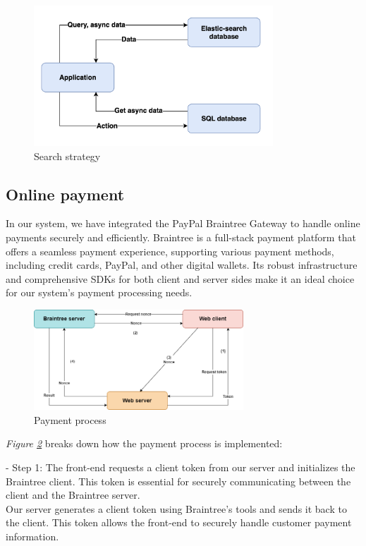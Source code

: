 \begin{figure}[H]
    \centering
    \includegraphics[width=0.8\textwidth]{Figures/search_strat.png}
    \caption{Search strategy}
    \label{fig:search-strategy}
\end{figure}

\subsection{Online payment}

In our system, we have integrated the PayPal Braintree Gateway to handle online payments securely and efficiently. Braintree is a full-stack payment platform that offers a seamless payment experience, supporting various payment methods, including credit cards, PayPal, and other digital wallets. Its robust infrastructure and comprehensive SDKs for both client and server sides make it an ideal choice for our system's payment processing needs.

\begin{figure}[H]
    \centering
    \includegraphics[width=0.7\textwidth]{Figures/payment-strat.png}
    \caption{Payment process}
    \label{fig:payment-flow}
\end{figure}

\emph{Figure \ref{fig:payment-flow}} breaks down how the payment process is implemented:

- Step 1:
The front-end requests a client token from our server and initializes the Braintree client. This token is essential for securely communicating between the client and the Braintree server.\\
Our server generates a client token using Braintree's tools and sends it back to the client. This token allows the front-end to securely handle customer payment information.

